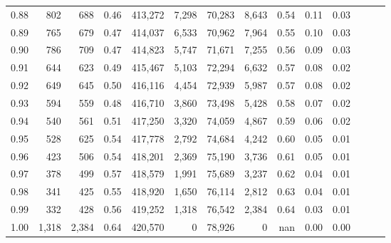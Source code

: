 \begin{tabular}{rrrrrrrrrrrrrr}
0.88 &     802 &    688 &  0.46 &  413,272 &    7,298 &  70,283 &   8,643 &  0.54 &  0.11 &      0.03 \\
0.89 &     765 &    679 &  0.47 &  414,037 &    6,533 &  70,962 &   7,964 &  0.55 &  0.10 &      0.03 \\
0.90 &     786 &    709 &  0.47 &  414,823 &    5,747 &  71,671 &   7,255 &  0.56 &  0.09 &      0.03 \\
0.91 &     644 &    623 &  0.49 &  415,467 &    5,103 &  72,294 &   6,632 &  0.57 &  0.08 &      0.02 \\
0.92 &     649 &    645 &  0.50 &  416,116 &    4,454 &  72,939 &   5,987 &  0.57 &  0.08 &      0.02 \\
0.93 &     594 &    559 &  0.48 &  416,710 &    3,860 &  73,498 &   5,428 &  0.58 &  0.07 &      0.02 \\
0.94 &     540 &    561 &  0.51 &  417,250 &    3,320 &  74,059 &   4,867 &  0.59 &  0.06 &      0.02 \\
0.95 &     528 &    625 &  0.54 &  417,778 &    2,792 &  74,684 &   4,242 &  0.60 &  0.05 &      0.01 \\
0.96 &     423 &    506 &  0.54 &  418,201 &    2,369 &  75,190 &   3,736 &  0.61 &  0.05 &      0.01 \\
0.97 &     378 &    499 &  0.57 &  418,579 &    1,991 &  75,689 &   3,237 &  0.62 &  0.04 &      0.01 \\
0.98 &     341 &    425 &  0.55 &  418,920 &    1,650 &  76,114 &   2,812 &  0.63 &  0.04 &      0.01 \\
0.99 &     332 &    428 &  0.56 &  419,252 &    1,318 &  76,542 &   2,384 &  0.64 &  0.03 &      0.01 \\
1.00 &   1,318 &  2,384 &  0.64 &  420,570 &        0 &  78,926 &       0 &   nan &  0.00 &      0.00 \\
\bottomrule
\end{tabular}
